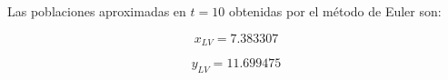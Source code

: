 \documentclass{article}
\begin{document}
Las poblaciones aproximadas en $t = 10$ obtenidas por el método de Euler son:

\begin{equation}
    x_{LV} =
    7.383307
    \label{eq:res:xlv}
\end{equation}

\begin{equation}
    y_{LV} =
    11.699475
    \label{eq:res:ylv}
\end{equation}
\end{document}
